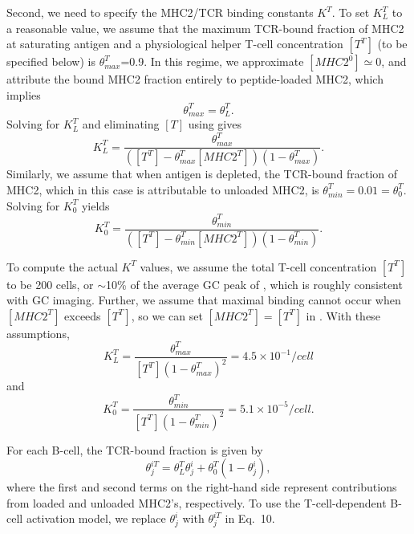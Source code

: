 Second, we need to specify the MHC2/TCR binding constants $K^T$. To
set $K_L^T$ to a reasonable value, we assume that the maximum TCR-bound
fraction of MHC2 at saturating antigen and a physiological helper T-cell
concentration $[T^T]$ (to be specified below) is $\theta^T_{max}$=0.9.
In this regime, we approximate $[MHC2^0]\simeq 0$, and attribute the bound MHC2 fraction entirely
to peptide-loaded MHC2, which implies
\begin{equation}
 \theta^T_{max} = \theta^T_L.
 \label{eq:hmax}
\end{equation}
Solving  for $K_L^T$ and eliminating $[T]$ using  gives
\begin{equation}
 K_L^T=\frac{\theta^T_{max}}{([T^T]-\theta^T_{max} [MHC2^T])(1-\theta^T_{max})}.
 \label{eq:kt1}
\end{equation}
Similarly, we assume that when antigen is depleted, the TCR-bound fraction of MHC2, which in this case is
attributable to unloaded MHC2, is $\theta^T_{min}=0.01=\theta^T_0$. Solving for $K_0^T$ yields
\begin{equation}
 K_0^T=\frac{\theta^T_{min}}{([T^T]-\theta^T_{min} [MHC2^T])(1-\theta^T_{min})}.
 \label{eq:kt0}
\end{equation}

To compute the actual $K^T$ values, we assume the total T-cell concentration $[T^T]$ to be 200 cells, or $\sim$10\% of the average
GC peak of \citet{wittenbrink11}, which is roughly consistent with GC imaging.\cite{allen07} Further, we assume that maximal
binding cannot occur when $[MHC2^T]$ exceeds $[T^T]$, so we can set $[MHC2^T]=[T^T]$ in . With these assumptions,
\begin{equation}
 K_L^T=\frac{\theta^T_{max}}{[T^T] (1-\theta^T_{max})^2}=4.5\times 10^{-1}/cell
\end{equation}
and
\begin{equation}
 K_0^T=\frac{\theta^T_{min}}{[T^T] (1-\theta^T_{min})^2}=5.1\times 10^{-5}/cell.
\end{equation}

For each B-cell, the TCR-bound fraction is given by
\begin{equation}
 \theta^{iT}_j = \theta^T_L \theta^i_j + \theta^T_0 (1-\theta^i_j),
\end{equation}
where the first and second terms on the right-hand side represent contributions from loaded and unloaded MHC2's, respectively.
To use the T-cell-dependent B-cell activation model, we replace $\theta^i_j$ with $\theta^{iT}_j$ in Eq.~10.

